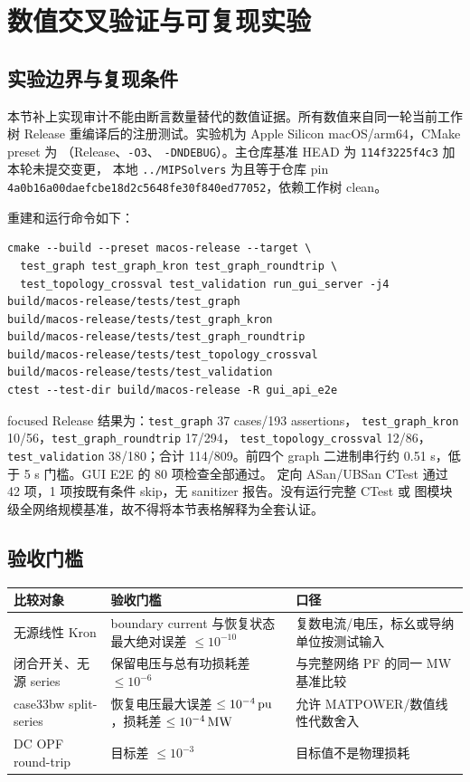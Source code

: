 \section{数值交叉验证与可复现实验}\label{sec:gr-numerical-crossval}

\subsection{实验边界与复现条件}

本节补上实现审计不能由断言数量替代的数值证据。所有数值来自同一轮当前工作树
Release 重编译后的注册测试。实验机为 Apple Silicon
macOS/arm64，CMake preset 为 （Release、\texttt{-O3}、
\texttt{-DNDEBUG}）。主仓库基准 HEAD 为 \texttt{114f3225f4c3} 加本轮未提交变更，
本地 \texttt{../MIPSolvers} 为且等于仓库 pin
\texttt{4a0b16a00daefcbe18d2c5648fe30f840ed77052}，依赖工作树 clean。

重建和运行命令如下：
\begin{verbatim}
cmake --build --preset macos-release --target \
  test_graph test_graph_kron test_graph_roundtrip \
  test_topology_crossval test_validation run_gui_server -j4
build/macos-release/tests/test_graph
build/macos-release/tests/test_graph_kron
build/macos-release/tests/test_graph_roundtrip
build/macos-release/tests/test_topology_crossval
build/macos-release/tests/test_validation
ctest --test-dir build/macos-release -R gui_api_e2e
\end{verbatim}

focused Release 结果为：\texttt{test\_graph} 37 cases/193 assertions，
\texttt{test\_graph\_kron} 10/56，\texttt{test\_graph\_roundtrip} 17/294，
\texttt{test\_topology\_crossval} 12/86，\texttt{test\_validation} 38/180；合计
114/809。前四个 graph 二进制串行约 0.51 s，低于 5 s 门槛。GUI E2E 的 80 项检查全部通过。
定向 ASan/UBSan CTest 通过 42 项，1 项按既有条件 skip，无 sanitizer 报告。没有运行完整 CTest 或
图模块级全网络规模基准，故不得将本节表格解释为全套认证。

\subsection{验收门槛}

\begin{center}\small
\begin{tabular}{@{}L{5.0cm}L{3.0cm}L{5.2cm}@{}}
\toprule
比较对象 & 验收门槛 & 口径\\
\midrule
无源线性 Kron & boundary current 与恢复状态最大绝对误差 $\le 10^{-10}$ & 复数电流/电压，标幺或导纳单位按测试输入\\
闭合开关、无源 series & 保留电压与总有功损耗差 $\le 10^{-6}$ & 与完整网络 PF 的同一 MW 基准比较\\
case33bw split-series & 恢复电压最大误差 $\le 10^{-4}\,{\rm pu}$，损耗差 $\le 10^{-4}\,{\rm MW}$ & 允许 MATPOWER/数值线性代数舍入\\
DC OPF round-trip & 目标差 $\le 10^{-3}$ & 目标值不是物理损耗\\
\bottomrule
\end{tabular}
\end{center}

